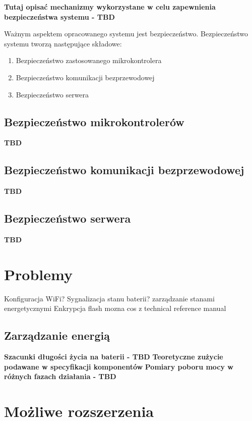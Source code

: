         \textbf{Tutaj opisać mechanizmy wykorzystane w celu zapewnienia bezpieczeństwa systemu - TBD}

        Ważnym aspektem opracowanego systemu jest bezpieczeństwo. Bezpieczeństwo systemu tworzą następujące składowe:
            \begin{enumerate}
                \item Bezpieczeństwo zastosowanego mikrokontrolera
                \item Bezpieczeństwo komunikacji bezprzewodowej
                \item Bezpieczeństwo serwera
            \end{enumerate}

            \subsection{Bezpieczeństwo mikrokontrolerów}
                \textbf{TBD}

            \subsection{Bezpieczeństwo komunikacji bezprzewodowej}
                \textbf{TBD}

            \subsection{Bezpieczeństwo serwera}
                \textbf{TBD}


    \section{Problemy}

        Konfiguracja WiFi?
        Sygnalizacja stanu baterii?
        zarządzanie stanami energetycznymi
        Enkrypcja flash
        mozna cos z technical reference manual

        \subsection{Zarządzanie energią}

            \textbf{Szacunki długości życia na baterii - TBD}
            \textbf{Teoretyczne zużycie podawane w specyfikacji komponentów}
            \textbf{Pomiary poboru mocy w różnych fazach działania - TBD}

    \section{Możliwe rozszerzenia}

